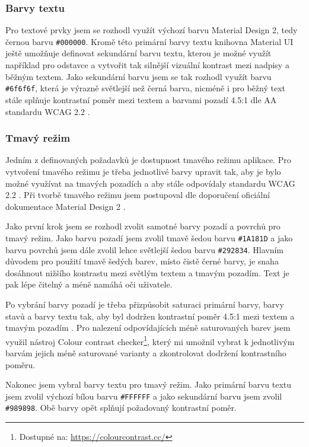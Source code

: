 \subsubsection{Barvy textu}

Pro textové prvky jsem se rozhodl využít výchozí barvu Material Design 2, tedy černou barvu \texttt{\#000000}. Kromě této primární barvy textu knihovna Material UI ještě umožňuje definovat sekundární barvu textu, kterou je možné využít například pro odstavce a vytvořit tak silnější vizuální kontrast mezi nadpisy a běžným textem. Jako sekundární barvu jsem se tak rozhodl využít barvu \texttt{\#6f6f6f}, která je výrazně světlejší než černá barva, nicméně i pro běžný text stále splňuje kontrastní poměr mezi textem a barvami pozadí 4.5:1 dle AA standardu WCAG 2.2 \cite{WCAG22}.

\subsubsection{Tmavý režim}

Jedním z definovaných požadavků je dostupnost tmavého režimu aplikace. Pro vytvoření tmavého režimu je třeba jednotlivé barvy upravit tak, aby je bylo možné využívat na tmavých pozadích a aby stále odpovídaly standardu WCAG 2.2 \cite{WCAG22}. Při tvorbě tmavého režimu jsem postupoval dle doporučení oficiální dokumentace Material Design 2 \cite{MaterialDesign2DarkTheme}.

Jako první krok jsem se rozhodl zvolit samotné barvy pozadí a povrchů pro tmavý režim. Jako barvu pozadí jsem zvolil tmavě šedou barvu \texttt{\#1A181D} a jako barvu povrchů jsem dále zvolil lehce světlejší šedou barvu \texttt{\#292834}. Hlavním důvodem pro použití tmavě šedých barev, místo čistě černé barvy, je snaha dosáhnout nižšího kontrastu mezi světlým textem a tmavým pozadím. Text je pak lépe čitelný a méně namáhá oči uživatele. \cite{MaterialDesign2DarkTheme}

Po vybrání barvy pozadí je třeba přizpůsobit saturaci primární barvy, barvy stavů a barvy textu tak, aby byl dodržen kontrastní poměr 4.5:1 mezi textem a tmavým pozadím \cite{WCAG22}. Pro nalezení odpovídajících méně saturovaných barev jsem využil nástroj Colour contrast checker\footnote{Dostupné na: \href{https://colourcontrast.cc/}{https://colourcontrast.cc/}}, který mi umožnil vybrat k jednotlivým barvám jejich méně saturované varianty a zkontrolovat dodržení kontrastního poměru.

Nakonec jsem vybral barvy textu pro tmavý režim. Jako primární barvu textu jsem zvolil výchozí bílou barvu \texttt{\#FFFFFF} a jako sekundární barvu jsem zvolil \texttt{\#989898}. Obě barvy opět splňují požadovaný kontrastní poměr.

